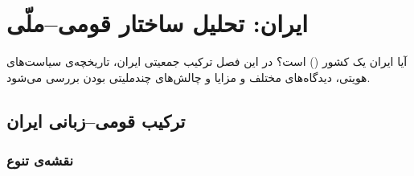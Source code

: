 
\chapter{ایران: تحلیل ساختار قومی–ملّی}

\begin{keybox}
آیا ایران یک کشور  () است؟
در این فصل ترکیب جمعیتی ایران، تاریخچه‌ی سیاست‌های هویتی، دیدگاه‌های مختلف
و مزایا و چالش‌های چندملیتی بودن بررسی می‌شود.
\end{keybox}

\section{ترکیب قومی–زبانی ایران}

\subsection{نقشه‌ی تنوع}

